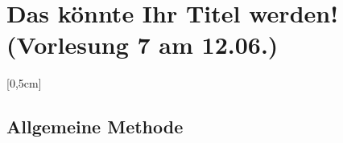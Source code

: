 \section{Das könnte Ihr Titel werden! \small (Vorlesung 7 am 12.06.)}
\marginnote{\small\emph{()}}[0,5cm]

\subsection{Allgemeine Methode}

